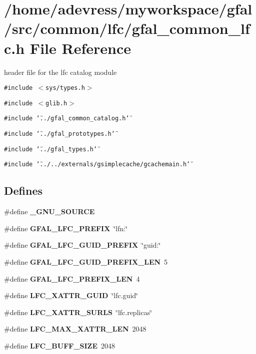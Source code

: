 \section{/home/adevress/myworkspace/gfal/src/common/lfc/gfal\_\-common\_\-lfc.h File Reference}
\label{gfal__common__lfc_8h}
header file for the lfc catalog module 

{\tt \#include $<$sys/types.h$>$}\par
{\tt \#include $<$glib.h$>$}\par
{\tt \#include \char`\"{}../gfal\_\-common\_\-catalog.h\char`\"{}}\par
{\tt \#include \char`\"{}../gfal\_\-prototypes.h\char`\"{}}\par
{\tt \#include \char`\"{}../gfal\_\-types.h\char`\"{}}\par
{\tt \#include \char`\"{}../../externals/gsimplecache/gcachemain.h\char`\"{}}\par
\subsection*{Defines}
\begin{CompactItemize}
\item 
\#define \textbf{\_\-GNU\_\-SOURCE}\label{gfal__common__lfc_8h_53abf256730d533302d1910e5fb61efe}

\item 
\#define \textbf{GFAL\_\-LFC\_\-PREFIX}~\char`\"{}lfn:\char`\"{}\label{gfal__common__lfc_8h_c00d877428b39b35b4f611656b2d5215}

\item 
\#define \textbf{GFAL\_\-LFC\_\-GUID\_\-PREFIX}~\char`\"{}guid:\char`\"{}\label{gfal__common__lfc_8h_26b46ea74b4efcdd46ce519863bdc90f}

\item 
\#define \textbf{GFAL\_\-LFC\_\-GUID\_\-PREFIX\_\-LEN}~5\label{gfal__common__lfc_8h_4609690cfa23a9bb0a209f745f183c9d}

\item 
\#define \textbf{GFAL\_\-LFC\_\-PREFIX\_\-LEN}~4\label{gfal__common__lfc_8h_0f0b96660a7e6440a6556909e7195109}

\item 
\#define \textbf{LFC\_\-XATTR\_\-GUID}~\char`\"{}lfc.guid\char`\"{}\label{gfal__common__lfc_8h_8f6afce6b30cd0685eaa45170f52c98e}

\item 
\#define \textbf{LFC\_\-XATTR\_\-SURLS}~\char`\"{}lfc.replicas\char`\"{}\label{gfal__common__lfc_8h_c1963dd5788b4452446d741e07e7f417}

\item 
\#define \textbf{LFC\_\-MAX\_\-XATTR\_\-LEN}~2048\label{gfal__common__lfc_8h_cb8d26c67c686b15d05f59def23e1356}

\item 
\#define \textbf{LFC\_\-BUFF\_\-SIZE}~2048\label{gfal__common__lfc_8h_90255f6e7148a56a2c09cc15098643d5}

\end{CompactItemize}
